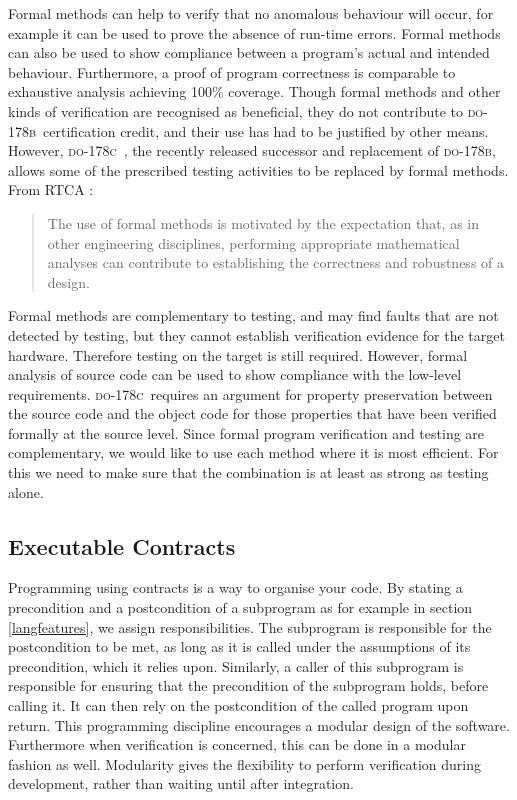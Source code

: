 \documentclass[sttt,final]{svjour}
\newcommand{\DOB}{\textsc{do-178b}}
\newcommand{\DOC}{\textsc{do-178c}}
\begin{document}
Formal methods can help to verify that no anomalous behaviour will
occur, for example it can be used to prove the absence of run-time
errors. Formal methods can also be used to show compliance between a
program's actual and intended behaviour. Furthermore, a proof of
program correctness is comparable to exhaustive analysis achieving
100\% coverage. Though formal methods and other kinds of verification
are recognised as beneficial, they do not contribute to \DOB\
certification credit, and their use has had to be justified by other
means. However, \DOC\ \cite{do178c}, the recently released successor and
replacement of \DOB, allows some of the prescribed testing
activities to be replaced by formal methods. From RTCA \cite{do178c}:
%
\begin{quote}
  The use of formal methods is motivated by the expectation that, as
  in other engineering disciplines, performing appropriate
  mathematical analyses can contribute to establishing the correctness
  and robustness of a design.
\end{quote}
%
Formal methods are complementary to testing, and may find faults that
are not detected by testing, but they cannot establish verification
evidence for the target hardware. Therefore testing on the target is
still required. However, formal analysis of source code can be used to
show compliance with the low-level requirements. \DOC\ requires an
argument for property preservation between the source code and the
object code for those properties that have been verified formally at
the source level. Since formal program verification and testing are
complementary, we would like to use each method where it is most
efficient. For this we need to make sure that the combination is at
least as strong as testing alone.

\subsection{Executable Contracts}
Programming using contracts is a way to organise your code. By stating
a precondition and a postcondition of a subprogram as for example in
section \ref{langfeatures}, we assign responsibilities. The subprogram
is responsible for the postcondition to be met, as long as it is
called under the assumptions of its precondition, which it relies
upon. Similarly, a caller of this subprogram is responsible for ensuring that
the precondition of the subprogram holds, before calling it. It can
then rely on the postcondition of the called program upon return. This
programming discipline encourages a modular design of the
software. Furthermore when verification is concerned, this can be done
in a modular fashion as well. Modularity gives the flexibility to
perform verification during development, rather than waiting until
after integration.
\end{document}
